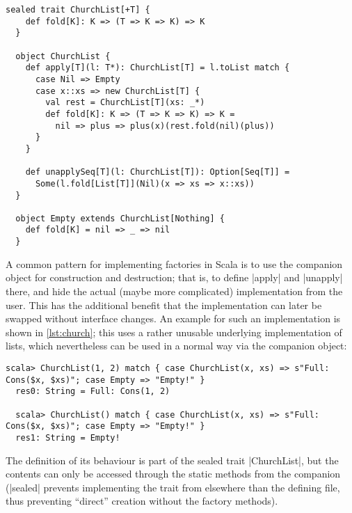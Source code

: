 \begin{lstlisting}[style=floating, label=lst:church, 
  caption={An implementation for polymorphic Church encoded lists. The \texttt{apply} and 
    \texttt{unapply} methods are the only way to construct and deconstruct them; from a 
    more theoretical point of view, they form the isomorphism between \texttt{ChurchList[T]}
    and the builtin \texttt{List[T]}. \texttt{Empty} is defined as a dedicated object to allow
    sharing and to make pattern matching look more natural.
    \hfill\github{dsl-examples/blob/master/src/main/scala/dsl_examples/ChurchList.scala}}]
  sealed trait ChurchList[+T] {
    def fold[K]: K => (T => K => K) => K
  }

  object ChurchList {
    def apply[T](l: T*): ChurchList[T] = l.toList match {
      case Nil => Empty
      case x::xs => new ChurchList[T] {
        val rest = ChurchList[T](xs: _*)
        def fold[K]: K => (T => K => K) => K =
          nil => plus => plus(x)(rest.fold(nil)(plus))
      }
    }
    
    def unapplySeq[T](l: ChurchList[T]): Option[Seq[T]] = 
      Some(l.fold[List[T]](Nil)(x => xs => x::xs))
  }

  object Empty extends ChurchList[Nothing] {
    def fold[K] = nil => _ => nil
  }
\end{lstlisting}

A common pattern for implementing factories in Scala is to use the companion object for construction
and destruction; that is, to define |apply| and |unapply| there, and hide the actual (maybe more
complicated) implementation from the user. This has the additional benefit that the implementation
can later be swapped without interface changes. An example for such an implementation is shown in
\autoref{lst:church}; this uses a rather unusable underlying implementation of lists, which
nevertheless can be used in a normal way via the companion object:
\begin{lstlisting}[style=break-lines]
  scala> ChurchList(1, 2) match { case ChurchList(x, xs) => s"Full: Cons($x, $xs)"; case Empty => "Empty!" }
  res0: String = Full: Cons(1, 2)

  scala> ChurchList() match { case ChurchList(x, xs) => s"Full: Cons($x, $xs)"; case Empty => "Empty!" }
  res1: String = Empty!
\end{lstlisting}
The definition of its behaviour is part of the sealed trait |ChurchList|, but the contents can only
be accessed through the static methods from the companion (|sealed| prevents implementing the trait
from elsewhere than the defining file, thus preventing \enquote{direct} creation without the factory
methods).

